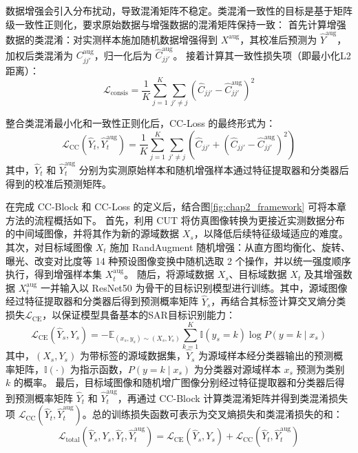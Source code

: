数据增强会引入分布扰动，导致混淆矩阵不稳定。类混淆一致性的目标是基于矩阵级一致性正则化，要求原始数据与增强数据的混淆矩阵保持一致：
首先计算增强数据的类混淆：对实测样本施加随机数据增强得到 $X^{\text{aug}}$，其校准后预测为 $\hat{Y}^{\text{aug}}$，
加权后类混淆为 $C_{jj'}^{\text{aug}}$，归一化后为 $\hat{C}_{jj'}^{\text{aug}}$。
接着计算其一致性损失项（即最小化L2距离）：
\begin{equation}
\mathcal{L}_{\text{consis}} = \frac{1}{K} \sum_{j=1}^{K} \sum_{j' \neq j} \left(\hat{C}_{jj'} - \hat{C}_{jj'}^{\text{aug}}\right)^2
\end{equation}

整合类混淆最小化和一致性正则化后，CC-Loss 的最终形式为：
\begin{equation}
\mathcal{L}_{\text{CC}}(\hat{Y}_t, \hat{Y}_t^{\text{aug}}) = \frac{1}{K} \sum_{j=1}^{K} \sum_{j' \neq j} \left( \hat{C}_{jj'} + \left(\hat{C}_{jj'} - \hat{C}_{jj'}^{\text{aug}}\right)^2 \right)
\end{equation}
其中，$\hat{Y}_t$ 和 $\hat{Y}_t^{\text{aug}}$ 分别为实测原始样本和随机增强样本通过特征提取器和分类器后得到的校准后预测矩阵。


在完成 CC-Block 和 CC-Loss 的定义后，结合图\ref{fig:chap2_framework} 可将本章方法的流程概括如下。
首先，利用 CUT 将仿真图像转换为更接近实测数据分布的中间域图像，并将其作为新的源域数据 $X_s$，以降低后续特征级域适应的难度。
其次，对目标域图像 $X_t$ 施加 RandAugment 随机增强：从直方图均衡化、旋转、曝光、改变对比度等 14 种预设图像变换中随机选取 2 个操作，并以统一强度顺序执行，得到增强样本集 $X_t^{\text{aug}}$。
随后，将源域数据 $X_s$、目标域数据 $X_t$ 及其增强数据 $X_t^{\text{aug}}$ 一并输入以 ResNet50 为骨干的目标识别模型进行训练。其中，源域图像经过特征提取器和分类器后得到预测概率矩阵 $\hat{Y}_s$，再结合其标签计算交叉熵分类损失$\mathcal{L}_{\text{CE}}$，以保证模型具备基本的SAR目标识别能力：
\begin{equation}
\mathcal{L}_{\text{CE}}(\hat{Y}_s, Y_s) = -\mathbb{E}_{(x_s, y_s) \sim (X_s, Y_s)} \sum_{k=1}^{K} \mathbb{I}(y_s = k)\log P(y = k \mid x_s)
\end{equation}
其中，$(X_s, Y_s)$ 为带标签的源域数据集，$\hat{Y}_s$ 为源域样本经分类器输出的预测概率矩阵，$\mathbb{I}(\cdot)$ 为指示函数，$P(y = k \mid x_s)$ 为分类器对源域样本 $x_s$ 预测为类别 $k$ 的概率。
最后，目标域图像和随机增广图像分别经过特征提取器和分类器后得到预测概率矩阵 $\hat{Y}_t$ 和 $\hat{Y}_t^{\text{aug}}$，再通过 CC-Block 计算类混淆矩阵并得到类混淆损失项 $\mathcal{L}_{\text{CC}}(\hat{Y}_t, \hat{Y}_t^{\text{aug}})$。总的训练损失函数可表示为交叉熵损失和类混淆损失的和：
\begin{equation}   
\mathcal{L}_{\text{total}}(\hat{Y}_s, Y_s, \hat{Y}_t, \hat{Y}_t^{\text{aug}}) = \mathcal{L}_{\text{CE}}(\hat{Y}_s, Y_s) + \mathcal{L}_{\text{CC}}(\hat{Y}_t, \hat{Y}_t^{\text{aug}})
\end{equation}

